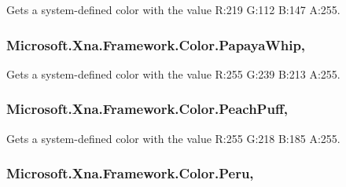 Gets a system-\/defined color with the value R\+:219 G\+:112 B\+:147 A\+:255.

\hypertarget{struct_microsoft_1_1_xna_1_1_framework_1_1_color_a10b6a2d00456018d3d18dd62f800d733}{}
\subsubsection[{Papaya\+Whip}]{ Microsoft.\+Xna.\+Framework.\+Color.\+Papaya\+Whip\hspace{0.3cm}{\ttfamily [static]}, {\ttfamily [get]}}\label{struct_microsoft_1_1_xna_1_1_framework_1_1_color_a10b6a2d00456018d3d18dd62f800d733}


Gets a system-\/defined color with the value R\+:255 G\+:239 B\+:213 A\+:255.

\hypertarget{struct_microsoft_1_1_xna_1_1_framework_1_1_color_aa6a9a00cc007102ea61f64526246e8e8}{}
\subsubsection[{Peach\+Puff}]{ Microsoft.\+Xna.\+Framework.\+Color.\+Peach\+Puff\hspace{0.3cm}{\ttfamily [static]}, {\ttfamily [get]}}\label{struct_microsoft_1_1_xna_1_1_framework_1_1_color_aa6a9a00cc007102ea61f64526246e8e8}


Gets a system-\/defined color with the value R\+:255 G\+:218 B\+:185 A\+:255.

\hypertarget{struct_microsoft_1_1_xna_1_1_framework_1_1_color_aa776b1abb6088bc4901b349c3cd7de56}{}
\subsubsection[{Peru}]{ Microsoft.\+Xna.\+Framework.\+Color.\+Peru\hspace{0.3cm}{\ttfamily [static]}, {\ttfamily [get]}}\label{struct_microsoft_1_1_xna_1_1_framework_1_1_color_aa776b1abb6088bc4901b349c3cd7de56}


